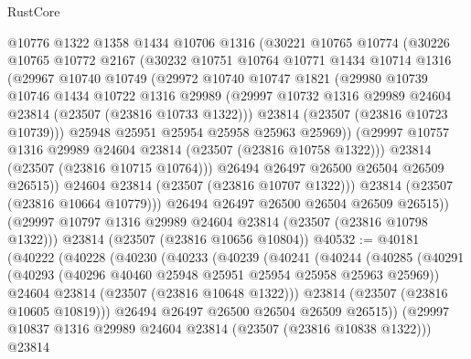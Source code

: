 \begin{lexlean}{RustCore}
\begin{coremodule}
            @10776
            @1322
            @1358
            @1434
            @10706
            @1316
            (@30221
              @10765
              @10774
              (@30226
                @10765
                @10772
                @2167
                (@30232
                  @10751
                  @10764
                  @10771
                  @1434
                  @10714
                  @1316
                  (@29967
                    @10740
                    @10749
                    (@29972
                      @10740
                      @10747
                      @1821
                      (@29980
                        @10739
                        @10746
                        @1434
                        @10722
                        @1316
                        @29989
                        (@29997 @10732 @1316 @29989 @24604 @23814 (@23507 (@23816 @10733 @1322)))
                        @23814
                        (@23507 (@23816 @10723 @10739)))
                      @25948
                      @25951
                      @25954
                      @25958
                      @25963
                      @25969))
                  (@29997 @10757 @1316 @29989 @24604 @23814 (@23507 (@23816 @10758 @1322)))
                  @23814
                  (@23507 (@23816 @10715 @10764)))
                @26494
                @26497
                @26500
                @26504
                @26509
                @26515))
            @24604
            @23814
            (@23507 (@23816 @10707 @1322)))
          @23814
          (@23507 (@23816 @10664 @10779)))
        @26494
        @26497
        @26500
        @26504
        @26509
        @26515))
    (@29997 @10797 @1316 @29989 @24604 @23814 (@23507 (@23816 @10798 @1322)))
    @23814
    (@23507 (@23816 @10656 @10804))
@40532 := @40181
    (@40222
      (@40228
        (@40230
          (@40233
            (@40239
              (@40241
                (@40244
                  (@40285
                    (@40291
                      (@40293 (@40296 @40460 @25948 @25951 @25954 @25958 @25963 @25969))
                      @24604
                      @23814
                      (@23507 (@23816 @10648 @1322)))
                    @23814
                    (@23507 (@23816 @10605 @10819)))
                  @26494
                  @26497
                  @26500
                  @26504
                  @26509
                  @26515))
              (@29997 @10837 @1316 @29989 @24604 @23814 (@23507 (@23816 @10838 @1322)))
              @23814

\end{coremodule}
\end{lexlean}
